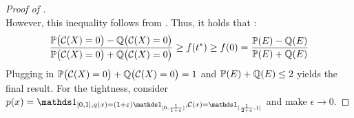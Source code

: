 \begin{proof}[Proof of ]
\begin{equation*}
    \end{equation*}
    However, this inequality follows from . 
    Thus, it holds that : \begin{equation*}
        \frac{\mathbb{P}\bigl(\mathcal{C}(X) =0\bigr) - \mathbb{Q}\bigl(\mathcal{C}(X) = 0\bigr)}{\mathbb{P}\bigl(\mathcal{C}(X) =0\bigr) + \mathbb{Q}\bigl(\mathcal{C}(X) = 0\bigr)} \geq f(t^*)\geq f(0) = \frac{\mathbb{P}(E)-\mathbb{Q}(E)}{\mathbb{P}(E)+\mathbb{Q}(E)}
    \end{equation*}
    Plugging in $\mathbb{P}\bigl(\mathcal{C}(X) =0\bigr) + \mathbb{Q}\bigl(\mathcal{C}(X) = 0\bigr) = 1 $ and $\mathbb{P}(E)+\mathbb{Q}(E)\leq 2$ yields the final result. 
    For the tightness, consider $p(x) = \ind{[0,1],q(x) = (1+\epsilon)\ind{[0,\frac{1}{1+\epsilon}]}, \mathcal{C}(x) = \ind{(\frac{1}{2+\epsilon},1]}}$ and make $\epsilon \rightarrow 0$.
\end{proof}


